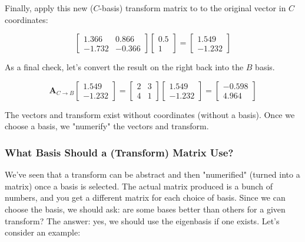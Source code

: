 \documentclass[main.tex]{subfiles}
\begin{document}
    Finally, apply this new ($C$-basis) transform matrix to to the original vector in $C$ coordinates: 
    
    $$
    \left[\begin{array}{cc}
    1.366 & 0.866 \\
    -1.732 & -0.366
    \end{array}\right]\left[\begin{array}{r}
    0.5 \\
    1
    \end{array}\right]=\left[\begin{array}{r}
    1.549 \\
    -1.232
    \end{array}\right]
    $$
    
    As a final check, let's convert the result on the right back into the $B$ basis. 
    
    $$
    \mathbf{A}_{C \rightarrow B}\left[\begin{array}{r}
    1.549 \\
    -1.232
    \end{array}\right]=\left[\begin{array}{ll}
    2 & 3 \\
    4 & 1
    \end{array}\right]\left[\begin{array}{r}
    1.549 \\
    -1.232
    \end{array}\right]=\left[\begin{array}{r}
    -0.598 \\
    4.964
    \end{array}\right]
    $$
    
    The vectors and transform exist without coordinates (without a basis). Once we choose a basis, we "numerify" the vectors and transform.
    
    \subsubsection{What Basis Should a (Transform) Matrix Use?}
    
    We've seen that a transform can be abstract and then "numerified" (turned into a matrix) once a basis is selected. The actual matrix produced is a bunch of numbers, and you get a different matrix for each choice of basis. Since we can choose the basis, we should ask: are some bases better than others for a given transform? The answer: yes, we should use the eigenbasis if one exists. Let's consider an example:
    
\end{document}

